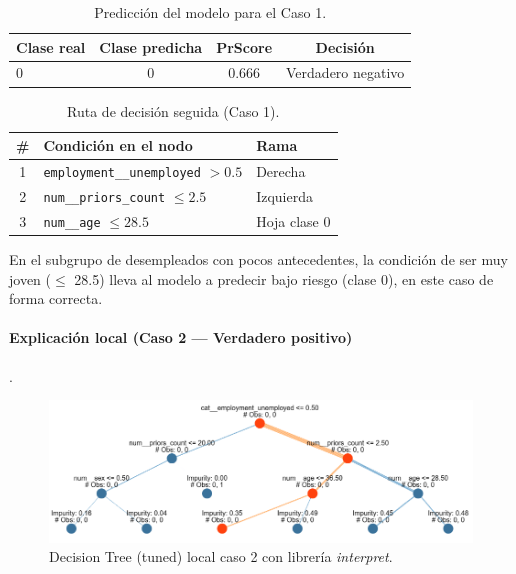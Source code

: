 \begin{table}[h!]
\centering
\caption{Predicción del modelo para el Caso 1.}
\label{tab:local-pred-caso1}
\small
\begin{tabular}{@{}lccc@{}}
\toprule
\textbf{Clase real} & \textbf{Clase predicha} & \textbf{PrScore} & \textbf{Decisión} \\
\midrule
0 & 0 & 0.666 & Verdadero negativo \\
\bottomrule
\end{tabular}
\end{table}

\begin{table}[h!]
\centering
\caption{Ruta de decisión seguida (Caso 1).}
\label{tab:local-path-caso1}
\small
\begin{tabular}{@{}cll@{}}
\toprule
\# & \textbf{Condición en el nodo} & \textbf{Rama} \\
\midrule
1 & \texttt{employment\_\_unemployed} \(> 0.5\) & Derecha \\
2 & \texttt{num\_\_priors\_count} \(\le 2.5\)   & Izquierda \\
3 & \texttt{num\_\_age} \(\le 28.5\)            & Hoja clase 0 \\
\bottomrule
\end{tabular}
\end{table}

En el subgrupo de desempleados con pocos antecedentes, la condición de ser muy joven ($\leq$ 28.5) lleva al modelo a predecir bajo riesgo (clase 0), en este caso de forma correcta.

\paragraph{Explicación local (Caso 2 — Verdadero positivo)}.

\begin{figure}[H]
  \centering
  \includegraphics[width=0.92\linewidth]{figures/decision_tree_tunned_depth_local2.png}
  \caption{Decision Tree (tuned) local caso 2 con librería \textit{interpret}.}
  \label{fig:tree-tuned_local2}
\end{figure}

